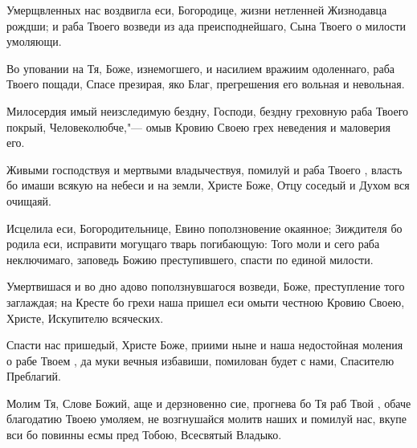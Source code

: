 \begin{mymulticols}
Умерщвленных нас воздвигла еси, Богородице, жизни нетленней Жизнодавца рождши; и раба Твоего  возведи из ада преисподнейшаго, Сына Твоего о милости умоляющи. 




Во уповании на Тя, Боже, изнемогшего, и насилием вражиим одоленнаго, раба Твоего пощади, Спасе презирая, яко Благ, прегрешения его вольная и невольная.


Милосердия имый неизследимую бездну, Господи, бездну греховную раба Твоего покрый, Человеколюбче,"--- омыв Кровию Своею грех неведения и маловерия его.

\slava

Живыми господствуя и мертвыми владычествуя, помилуй и раба Твоего , власть бо имаши всякую на небеси и на земли, Христе Боже, Отцу соседый и Духом вся очищаяй.

\inyne

Исцелила еси, Богородительнице, Евино поползновение окаянное; Зиждителя бо родила еси, исправити могущаго тварь погибающую: Того моли и сего раба  неключимаго, заповедь Божию преступившего, спасти по единой милости. 




Умертвишася и во дно адово поползнувшагося возведи, Боже, преступление того заглаждая; на Кресте бо грехи наша пришел еси омыти честною Кровию Своею, Христе, Искупителю всяческих.


Спасти нас пришедый, Христе Боже, приими ныне и наша недостойная моления о рабе Твоем , да муки вечныя избавиши, помилован будет с нами, Спасителю Преблагий.

\slava

Молим Тя, Слове Божий, аще и дерзновенно сие, прогнева бо Тя раб Твой , обаче благодатию Твоею умоляем, не возгнушайся молитв наших и помилуй нас, вкупе вси бо повинны есмы пред Тобою, Всесвятый Владыко.


\end{mymulticols}
